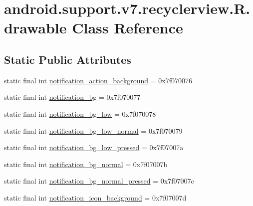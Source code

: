 \hypertarget{classandroid_1_1support_1_1v7_1_1recyclerview_1_1_r_1_1drawable}{}\section{android.\+support.\+v7.\+recyclerview.\+R.\+drawable Class Reference}
\label{classandroid_1_1support_1_1v7_1_1recyclerview_1_1_r_1_1drawable}
\subsection*{Static Public Attributes}
\begin{DoxyCompactItemize}
\item 
static final int \mbox{\hyperlink{classandroid_1_1support_1_1v7_1_1recyclerview_1_1_r_1_1drawable_a94ca1a9850cea62dab00fb3505930a59}{notification\+\_\+action\+\_\+background}} = 0x7f070076
\item 
static final int \mbox{\hyperlink{classandroid_1_1support_1_1v7_1_1recyclerview_1_1_r_1_1drawable_a0bf2ac43c54dd606778a2e103013605f}{notification\+\_\+bg}} = 0x7f070077
\item 
static final int \mbox{\hyperlink{classandroid_1_1support_1_1v7_1_1recyclerview_1_1_r_1_1drawable_a42699770e49598db6ff90796106e7b81}{notification\+\_\+bg\+\_\+low}} = 0x7f070078
\item 
static final int \mbox{\hyperlink{classandroid_1_1support_1_1v7_1_1recyclerview_1_1_r_1_1drawable_a49407e99ee20b81ba38cb9c26f8fde91}{notification\+\_\+bg\+\_\+low\+\_\+normal}} = 0x7f070079
\item 
static final int \mbox{\hyperlink{classandroid_1_1support_1_1v7_1_1recyclerview_1_1_r_1_1drawable_a2dd97900efe14bbb29bbbd9cdd6eb9e7}{notification\+\_\+bg\+\_\+low\+\_\+pressed}} = 0x7f07007a
\item 
static final int \mbox{\hyperlink{classandroid_1_1support_1_1v7_1_1recyclerview_1_1_r_1_1drawable_a3910d3d1677858ab7237dffb0d693d80}{notification\+\_\+bg\+\_\+normal}} = 0x7f07007b
\item 
static final int \mbox{\hyperlink{classandroid_1_1support_1_1v7_1_1recyclerview_1_1_r_1_1drawable_a75d2619b0abb694006ea86fbe5dbbd8d}{notification\+\_\+bg\+\_\+normal\+\_\+pressed}} = 0x7f07007c
\item 
static final int \mbox{\hyperlink{classandroid_1_1support_1_1v7_1_1recyclerview_1_1_r_1_1drawable_aea2f3dfe59f21f41485aba2f00aa8a88}{notification\+\_\+icon\+\_\+background}} = 0x7f07007d

\end{DoxyCompactItemize}
